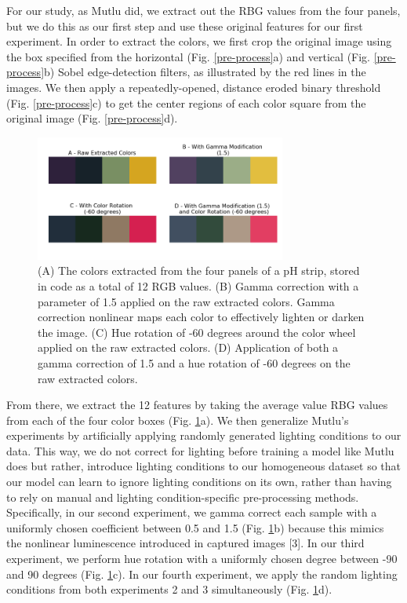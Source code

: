 \documentclass[journal]{IEEEtran}
\begin{document}
For our study, as Mutlu did, we extract out the RBG values from the four panels, but we do this as our first step and use these original features for our first experiment. In order to extract the colors, we first crop the original image using the box specified from the horizontal (Fig. \ref{pre-process}a) and vertical (Fig. \ref{pre-process}b) Sobel edge-detection filters, as illustrated by the red lines in the images. We then apply a repeatedly-opened, distance eroded binary threshold (Fig. \ref{pre-process}c) to get the center regions of each color square from the original image (Fig. \ref{pre-process}d).

\begin{figure}
\centering
\includegraphics[width=3.25in]{Fig_3.png}
\caption{(A) The colors extracted from the four panels of a pH strip, stored in code as a total of 12 RGB values. (B) Gamma correction with a parameter of 1.5 applied on the raw extracted colors. Gamma correction nonlinear maps each color to effectively lighten or darken the image. (C) Hue rotation of -60 degrees around the color wheel applied on the raw extracted colors. (D) Application of both a gamma correction of 1.5 and a hue rotation of -60 degrees on the raw extracted colors.}
\label{four-colors}
\end{figure}

From there, we extract the 12 features by taking the average value RBG values from each of the four color boxes (Fig. \ref{four-colors}a). We then generalize Mutlu’s experiments by artificially applying randomly generated lighting conditions to our data. This way, we do not correct for lighting before training a model like Mutlu does but rather, introduce lighting conditions to our homogeneous dataset so that our model can learn to ignore lighting conditions on its own, rather than having to rely on manual and lighting condition-specific pre-processing methods. Specifically, in our second experiment, we gamma correct each sample with a uniformly chosen coefficient between 0.5 and 1.5 (Fig. \ref{four-colors}b) because this mimics the nonlinear luminescence introduced in captured images [3]. In our third experiment, we perform hue rotation with a uniformly chosen degree between -90 and 90 degrees (Fig. \ref{four-colors}c). In our fourth experiment, we apply the random lighting conditions from both experiments 2 and 3 simultaneously (Fig. \ref{four-colors}d).
\end{document}
